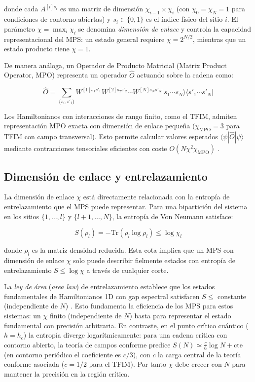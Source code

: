 \documentclass[11pt,a4paper,spanish]{book}
\begin{document}
\noindent donde cada $A^{[i]s_i}$ es una matriz de dimensión $\chi_{i-1} \times \chi_i$ (con $\chi_0 = \chi_N = 1$ para condiciones de contorno abiertas) y $s_i \in \{0, 1\}$ es el índice físico del sitio $i$. El parámetro $\chi = \max_i \chi_i$ se denomina \emph{dimensión de enlace} y controla la capacidad representacional del MPS: un estado general requiere $\chi = 2^{N/2}$, mientras que un estado producto tiene $\chi = 1$.

De manera análoga, un Operador de Producto Matricial (Matrix Product Operator, MPO) representa un operador $\hat{O}$ actuando sobre la cadena como:

\begin{equation}
\hat{O} = \sum_{\{s_i, s'_i\}} W^{[1]s_1 s'_1} W^{[2]s_2 s'_2} \cdots W^{[N]s_N s'_N} |s_1 \cdots s_N\rangle \langle s'_1 \cdots s'_N|
\label{eq:mpo}
\end{equation}

\noindent Los Hamiltonianos con interacciones de rango finito, como el TFIM, admiten representación MPO exacta con dimensión de enlace pequeña ($\chi_{\text{MPO}} = 3$ para TFIM con campo transversal). Esto permite calcular valores esperados $\langle \psi | \hat{O} | \psi \rangle$ mediante contracciones tensoriales eficientes con coste $O(N \chi^2 \chi_{\text{MPO}})$ \citep{schollwock2011}.

\subsection{Dimensión de enlace y entrelazamiento}

La dimensión de enlace $\chi$ está directamente relacionada con la entropía de entrelazamiento que el MPS puede representar. Para una bipartición del sistema en los sitios $\{1, \ldots, l\}$ y $\{l+1, \ldots, N\}$, la entropía de Von Neumann satisface:

\begin{equation}
S(\rho_l) = -\text{Tr}(\rho_l \log \rho_l) \leq \log \chi_l
\label{eq:entanglement_bound}
\end{equation}

\noindent donde $\rho_l$ es la matriz densidad reducida. Esta cota implica que un MPS con dimensión de enlace $\chi$ solo puede describir fielmente estados con entropía de entrelazamiento $S \leq \log \chi$ a través de cualquier corte.

La \emph{ley de área} (\emph{area law}) de entrelazamiento establece que los estados fundamentales de Hamiltonianos 1D con gap espectral satisfacen $S \leq$ constante (independiente de $N$) \citep{schollwock2011}. Esto fundamenta la eficiencia de los MPS para estos sistemas: un $\chi$ finito (independiente de $N$) basta para representar el estado fundamental con precisión arbitraria. En contraste, en el punto crítico cuántico ($h = h_c$) la entropía diverge logarítmicamente: para una cadena crítica con contorno abierto, la teoría de campos conforme predice $S(N) \simeq \frac{c}{6} \log N + \text{cte}$ (en contorno periódico el coeficiente es $c/3$), con $c$ la carga central de la teoría conforme asociada ($c = 1/2$ para el TFIM). Por tanto $\chi$ debe crecer con $N$ para mantener la precisión en la región crítica.
\end{document}
